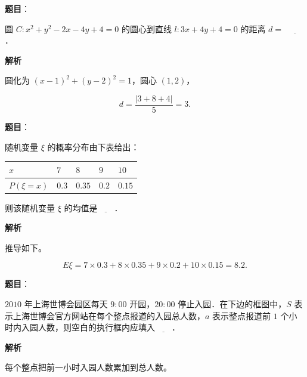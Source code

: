 \begin{answer}

\textbf{题目}：

圆 $C:x^2+y^2-2x-4y+4=0$ 的圆心到直线 $l:3x+4y+4=0$ 的距离 $d=$ $\underline{\qquad}$．

\textbf{解析}

圆化为 $(x-1)^2+(y-2)^2=1$，圆心 $(1,2)$，

\nopagebreak[4]
\[d=\frac{|3+8+4|}5=3.\]


\end{answer}
\begin{answer}

\textbf{题目}：

随机变量 $\xi$ 的概率分布由下表给出：

\begin{center}
\begin{tabular}{lllll}
\toprule
$x$ & $7$ & $8$ & $9$ & $10$ \\
\midrule
$P(\xi=x)$ & $0.3$ & $0.35$ & $0.2$ & $0.15$ \\
\bottomrule
\end{tabular}
\end{center}

则该随机变量 $\xi$ 的均值是$\underline{\qquad}$．

\textbf{解析}

推导如下。

\nopagebreak[4]
\[E\xi=7\times0.3+8\times0.35+9\times0.2+10\times0.15=8.2.\]


\end{answer}
\begin{answer}

\textbf{题目}：

$2010$ 年上海世博会园区每天 $9:00$ 开园，$20:00$ 停止入园．在下边的框图中，$S$ 表示上海世博会官方网站在每个整点报道的入园总人数，$a$ 表示整点报道前 $1$ 个小时内入园人数，则空白的执行框内应填入$\underline{\qquad}$．
\nopagebreak[4]
\begin{center}\end{center}
\nopagebreak[4]
\textbf{解析}

每个整点把前一小时入园人数累加到总人数。


\end{answer}

